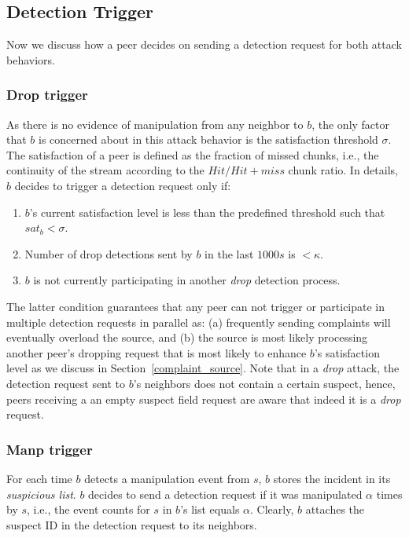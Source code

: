 \subsection{Detection Trigger}
\label{Detection-Trigger}
 Now we discuss how a peer decides on sending a detection request for both attack behaviors.
% 

\subsubsection*{Drop trigger}
As there is no evidence of manipulation from any neighbor to $b$, the only factor that $b$ is concerned about in this attack behavior is the satisfaction threshold $\sigma$.
The satisfaction of a peer is defined as the fraction of missed chunks, i.e., the continuity of the stream according to the $Hit/Hit+miss$ chunk ratio.
In details, $b$ decides to trigger a detection request only if:
\begin{enumerate}
 \item $b$'s current satisfaction level is less than the predefined threshold such that $sat_b < \sigma$.
 \item Number of drop detections sent by $b$ in the last $1000s$ is $< \kappa$.
 \item $b$ is not currently participating in another \textit{drop} detection process.
\end{enumerate}
The latter condition guarantees that any peer can not trigger or participate in multiple detection requests in parallel as: (a) frequently sending complaints will eventually overload the source,
and (b) the source is most likely processing another peer's dropping request that is most likely to enhance $b$'s satisfaction level as we discuss in Section~\ref{complaint_source}.
Note that in a \textit{drop} attack, the detection request sent to $b$'s neighbors does not contain a certain suspect, hence, peers receiving a an empty suspect field request are aware that indeed it is a \textit{drop} request.

\subsubsection*{Manp trigger}
For each time $b$ detects a manipulation event from $s$, $b$ stores the incident in its \textit{suspicious list}.
$b$ decides to send a detection request if it was manipulated $\alpha$ times by $s$, i.e., the event counts for $s$ in $b$'s list equals $\alpha$.
Clearly, $b$ attaches the suspect ID in the detection request to its neighbors.

